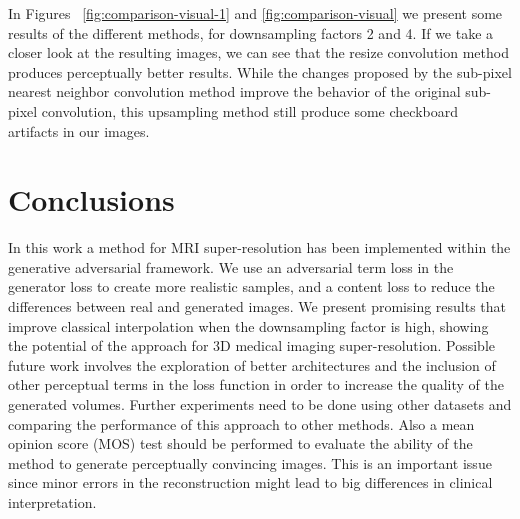 \documentclass{article}
\begin{document}
In Figures ~\ref{fig:comparison-visual-1} and \ref{fig:comparison-visual} we present some results of the different methods, for downsampling factors 2 and 4. If we take a closer look at the resulting images, we can see that the resize convolution method produces perceptually better results. While the changes proposed by the sub-pixel nearest neighbor convolution method improve the behavior of the original sub-pixel convolution, this upsampling method still produce some checkboard artifacts in our images.

\section{Conclusions}
\label{sec:foot}

In this work a method for MRI super-resolution has been implemented within the generative adversarial framework. 
We use an adversarial term loss in the generator loss to create more realistic samples, and a content loss to reduce the differences between real and generated images.
We present promising results that improve classical interpolation when the downsampling factor is high, showing the potential of the approach for 3D medical imaging super-resolution. 
Possible future work involves the exploration of better architectures and the inclusion of other perceptual terms in the loss function in order to increase the quality of the generated volumes. Further experiments need to be done using other datasets and comparing the performance of this approach to other methods. Also a mean opinion score (MOS) test should be performed to evaluate the ability of the method to generate perceptually convincing images. This is an important issue since minor errors in the reconstruction might lead to big differences in clinical interpretation. 


\end{document}

